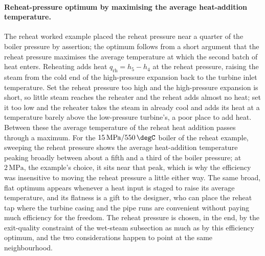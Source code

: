 \paragraph{Reheat-pressure optimum by maximising the average heat-addition
temperature.} The reheat worked example placed the reheat pressure near a quarter
of the boiler pressure by assertion; the optimum follows from a short argument that
the reheat pressure maximises the average temperature at which the second batch of
heat enters. Reheating adds heat $q_{\text{rh}} = h_5 - h_4$ at the reheat pressure,
raising the steam from the cold end of the high-pressure expansion back to the
turbine inlet temperature. Set the reheat pressure too high and the high-pressure
expansion is short, so little steam reaches the reheater and the reheat adds almost
no heat; set it too low and the reheater takes the steam in already cool and adds
its heat at a temperature barely above the low-pressure turbine's, a poor place to
add heat. Between these the average temperature of the reheat heat addition passes
through a maximum. For the $15\,\text{MPa}/550\,\degC$ boiler of the reheat example,
sweeping the reheat pressure shows the average heat-addition temperature peaking
broadly between about a fifth and a third of the boiler pressure; at
$2\,\text{MPa}$, the example's choice, it sits near that peak, which is why the
efficiency was insensitive to moving the reheat pressure a little either way. The
same broad, flat optimum appears whenever a heat input is staged to raise its
average temperature, and its flatness is a gift to the designer, who can place the
reheat tap where the turbine casing and the pipe runs are convenient without paying
much efficiency for the freedom. The reheat pressure is chosen, in the end, by the
exit-quality constraint of the wet-steam subsection as much as by this efficiency
optimum, and the two considerations happen to point at the same neighbourhood.

